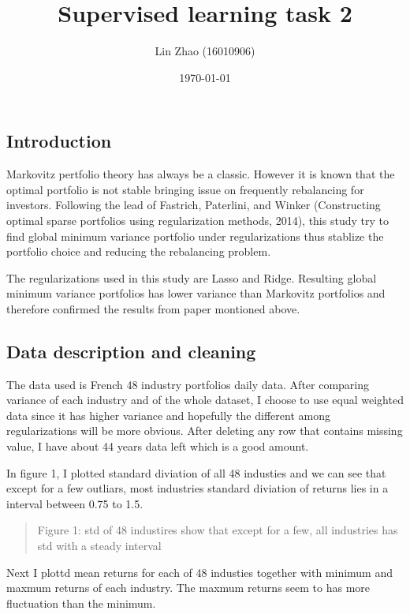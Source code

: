 \documentclass{article}
\newcommand{\ciapdf}[1]{\vspace*{-\parskip}\begin{center}\resizebox{0.75\textwidth}{!}{\texttt{[image: \#1]}}\end{center}}
\begin{document}
\title{Supervised learning task 2}
\author{Lin Zhao (16010906)}
\date{\today}
\maketitle

\newpage

\subsection*{Introduction}

Markovitz pertfolio theory has always be a classic. However it is known that
the optimal portfolio is not stable bringing issue on frequently rebalancing
for investors. Following the lead of Fastrich, Paterlini, and Winker (Constructing
optimal sparse portfolios using regularization methods, 2014), this study
try to find global minimum variance portfolio under regularizations thus stablize
the portfolio choice and reducing the rebalancing problem.

The regularizations used in this study are Lasso and Ridge. Resulting global
minimum variance portfolios has lower variance than Markovitz portfolios and
therefore confirmed the results from paper montioned above.

\subsection*{Data description and cleaning}

The data used is French 48 industry portfolios daily data. After comparing variance
of each industry and of the whole dataset, I choose to use equal weighted data
since it has higher variance and hopefully the different among regularizations
will be more obvious. After deleting any row that contains missing value, I have
about 44 years data left which is a good amount.

In figure 1, I plotted standard diviation of all 48 industies and we can see that
except for a few outliars, most industries standard diviation of returns lies
in a interval between 0.75 to 1.5.

\ciapdf{Figure_1T2.pdf}

\begin{quote}
Figure 1: std of 48 industires show that except for a few, all industries has
std with a steady interval
\end{quote}

Next I plottd mean returns for each of 48 industies together with minimum and maxmum
returns of each industry. The maxmum returns seem to has more fluctuation than
the minimum.
\end{document}
